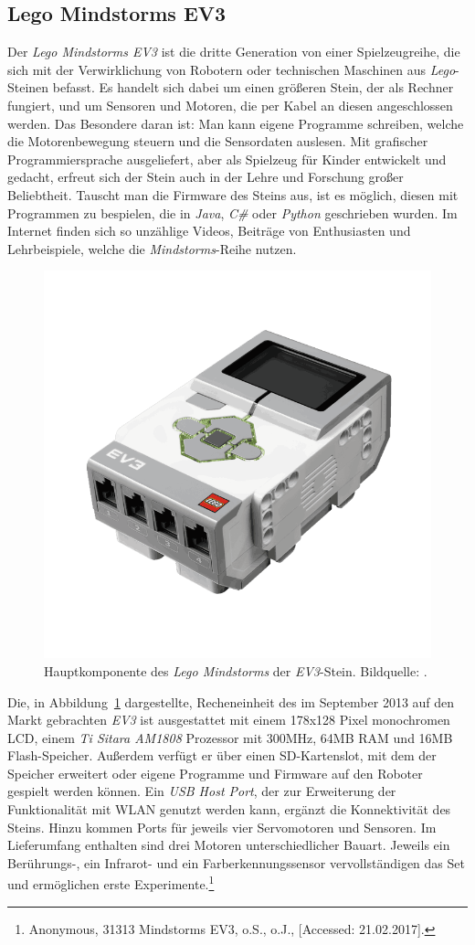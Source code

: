 \subsection{Lego Mindstorms EV3}\label{ssec:legoMindstorms}
Der \textit{Lego Mindstorms EV3} ist die dritte Generation von einer Spielzeugreihe, die sich mit der Verwirklichung von Robotern oder technischen Maschinen aus \textit{Lego}-Steinen befasst. Es handelt sich dabei um einen größeren Stein, der als Rechner fungiert, und um Sensoren und Motoren, die per Kabel an diesen angeschlossen werden. Das Besondere daran ist: Man kann eigene Programme schreiben, welche die Motorenbewegung steuern und die Sensordaten auslesen. Mit grafischer Programmiersprache ausgeliefert, aber als Spielzeug für Kinder entwickelt und gedacht, erfreut sich der Stein auch in der Lehre und Forschung großer Beliebtheit. Tauscht man die Firmware des Steins aus, ist es möglich, diesen mit Programmen zu bespielen, die in \textit{Java}, \textit{C\#} oder \textit{Python} geschrieben wurden. Im Internet finden sich so unzählige Videos, Beiträge von Enthusiasten und Lehrbeispiele, welche die \textit{Mindstorms}-Reihe nutzen.
\begin{figure}[H]
	\centering
	\includegraphics[width=.75\textwidth]{figuren/ev3}
	\caption{Hauptkomponente des \textit{Lego Mindstorms} der \textit{EV3}-Stein. Bildquelle: \cite{ev3}.}
	\label{fig:ev3}
\end{figure}
Die, in Abbildung~\ref{fig:ev3} dargestellte, Recheneinheit des im September 2013 auf den Markt gebrachten \textit{EV3} ist ausgestattet mit einem 178x128 Pixel monochromen LCD, einem \textit{Ti Sitara AM1808} Prozessor mit 300MHz, 64MB RAM und 16MB Flash-Speicher. Außerdem verfügt er über einen SD-Kartenslot, mit dem der Speicher erweitert oder eigene Programme und Firmware auf den Roboter gespielt werden können. Ein \textit{USB Host Port}, der zur Erweiterung der Funktionalität mit WLAN genutzt werden kann, ergänzt die Konnektivität des Steins. Hinzu kommen Ports für jeweils vier Servomotoren und Sensoren. Im Lieferumfang enthalten sind drei Motoren unterschiedlicher Bauart. Jeweils ein Berührungs-, ein Infrarot- und ein Farberkennungssensor vervollständigen das Set und ermöglichen erste Experimente.\footnote{ Anonymous, 31313 Mindstorms EV3, o.S., o.J., [Accessed: 21.02.2017].}

